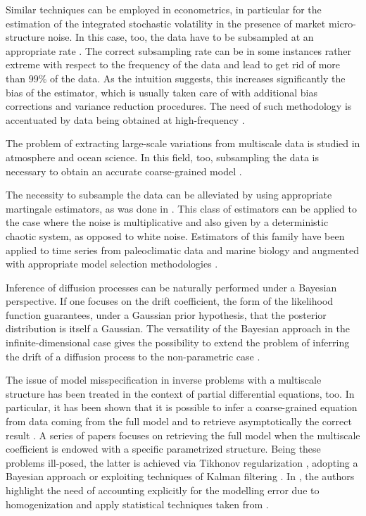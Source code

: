 \documentclass[10pt]{article}
\begin{document}
Similar techniques can be employed in econometrics, in particular for the estimation of the integrated stochastic volatility in the presence of market micro-structure noise. In this case, too, the data have to be subsampled at an appropriate rate \cite{AMZ05,OSP10}. The correct subsampling rate can be in some instances rather extreme with respect to the frequency of the data and lead to get rid of more than $99\%$ of the data. As the intuition suggests, this increases significantly the bias of the estimator, which is usually taken care of with additional bias corrections and variance reduction procedures. The need of such methodology is accentuated by data being obtained at high-frequency \cite{AiJ14,ZMA05}.  

The problem of extracting large-scale variations from multiscale data is studied in atmosphere and ocean science. In this field, too, subsampling the data is necessary to obtain an accurate coarse-grained model \cite{CoP09,YMV19}.

The necessity to subsample the data can be alleviated by using appropriate martingale estimators, as was done in \cite{KPK13,KKP15}. This class of estimators can be applied to the case where the noise is multiplicative and also given by a deterministic chaotic system, as opposed to white noise. Estimators of this family have been applied to time series from paleoclimatic data and marine biology and augmented with appropriate model selection methodologies \cite{KPP15}. 

Inference of diffusion processes can be naturally performed under a Bayesian perspective. If one focuses on the drift coefficient, the form of the likelihood function guarantees, under a Gaussian prior hypothesis, that the posterior distribution is itself a Gaussian. The versatility of the Bayesian approach in the infinite-dimensional case \cite{Stu10, DaS16} gives the possibility to extend the problem of inferring the drift of a diffusion process to the non-parametric case \cite{PSV09, PSZ13}. 

The issue of model misspecification in inverse problems with a multiscale structure has been treated in the context of partial differential equations, too. In particular, it has been shown that it is possible to infer a coarse-grained equation from data coming from the full model and to retrieve asymptotically the correct result \cite{NPS12}. A series of papers \cite{AbD18, AbD19, AGZ19} focuses on retrieving the full model when the multiscale coefficient is endowed with a specific parametrized structure. Being these problems ill-posed, the latter is achieved via Tikhonov regularization \cite{AbD19,NPS12}, adopting a Bayesian approach \cite{AbD18, NPS12} or exploiting techniques of Kalman filtering \cite{AGZ19}. In \cite{AbD18,AGZ19}, the authors highlight the need of accounting explicitly for the modelling error due to homogenization and apply statistical techniques taken from \cite{CDS18,CES14}.
\end{document}
